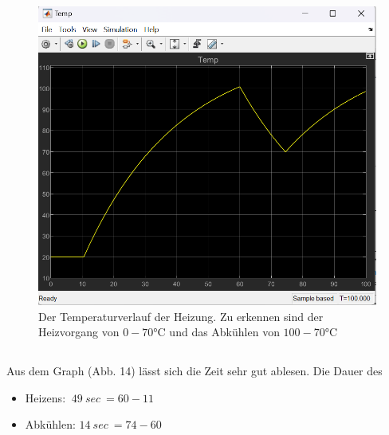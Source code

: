 \documentclass{article}
\begin{document}
		\subsection{}
			\begin{figure}[h]
				\centering
				\includegraphics[scale=0.46]{Aufgabe4cTempDisplay.png}
				\caption{Der Temperaturverlauf der Heizung. Zu erkennen sind der Heizvorgang von $0 - 70$°C und das Abkühlen von $100 - 70$°C}
				\label{fig_14: Aufg_4c_TempGraph}
			\end{figure}
\clearpage
		\subsection{}
			Aus dem Graph (Abb. 14) lässt sich die Zeit sehr gut ablesen. Die Dauer des
			\begin{itemize}
				\item Heizens: $\ 49\ sec\ = 60 - 11$
				\item Abkühlen: $ 14\ sec\ = 74 - 60$
			\end{itemize}
		
\end{document}
